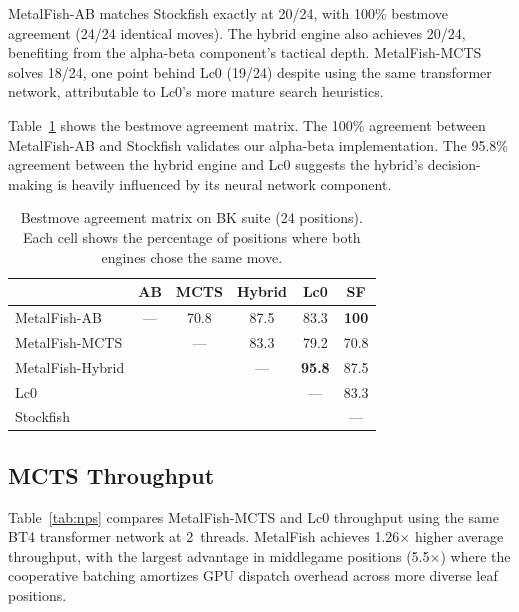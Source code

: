 \documentclass{svproc}
\begin{document}
MetalFish-AB matches Stockfish exactly at 20/24, with 100\% bestmove agreement (24/24 identical moves). The hybrid engine also achieves 20/24, benefiting from the alpha-beta component's tactical depth. MetalFish-MCTS solves 18/24, one point behind Lc0 (19/24) despite using the same transformer network, attributable to Lc0's more mature search heuristics.

Table~\ref{tab:agreement} shows the bestmove agreement matrix. The 100\% agreement between MetalFish-AB and Stockfish validates our alpha-beta implementation. The 95.8\% agreement between the hybrid engine and Lc0 suggests the hybrid's decision-making is heavily influenced by its neural network component.

\begin{table}[!htbp]
\centering
\caption{Bestmove agreement matrix on BK suite (24 positions). Each cell shows the percentage of positions where both engines chose the same move.}
\label{tab:agreement}
\begin{tabular}{lccccc}
\toprule
& \textbf{AB} & \textbf{MCTS} & \textbf{Hybrid} & \textbf{Lc0} & \textbf{SF} \\
\midrule
MetalFish-AB & --- & 70.8 & 87.5 & 83.3 & \textbf{100} \\
MetalFish-MCTS & & --- & 83.3 & 79.2 & 70.8 \\
MetalFish-Hybrid & & & --- & \textbf{95.8} & 87.5 \\
Lc0 & & & & --- & 83.3 \\
Stockfish & & & & & --- \\
\bottomrule
\end{tabular}
\end{table}

\FloatBarrier
\subsection{MCTS Throughput}
\label{sec:eval-throughput}

Table~\ref{tab:nps} compares MetalFish-MCTS and Lc0 throughput using the same BT4 transformer network at 2~threads. MetalFish achieves 1.26$\times$ higher average throughput, with the largest advantage in middlegame positions (5.5$\times$) where the cooperative batching amortizes GPU dispatch overhead across more diverse leaf positions.
\end{document}

